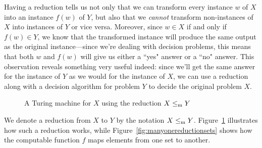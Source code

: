 Having a reduction tells us not only that we can transform every instance $w$ of $X$ into an instance $f(w)$ of $Y$, but also that we \emph{cannot} transform non-instances of $X$ into instances of $Y$ or vice versa. Moreover, since $w \in X$ if and only if $f(w) \in Y$, we know that the transformed instance will produce the same output as the original instance---since we're dealing with decision problems, this means that both $w$ and $f(w)$ will give us either a ``yes" answer or a ``no" answer. This observation reveals something very useful indeed: since we'll get the same answer for the instance of $Y$ as we would for the instance of $X$, we can use a reduction along with a decision algorithm for problem $Y$ to decide the original problem $X$.

\begin{figure}
\centering
{}
\caption{A Turing machine for $X$ using the reduction $X \leq_{\mathrm{m}} Y$}
\label{fig:manyonereduction}
\end{figure}

We denote a reduction from $X$ to $Y$ by the notation $X \leq_{\mathrm{m}} Y$. Figure~\ref{fig:manyonereduction} illustrates how such a reduction works, while Figure~\ref{fig:manyonereductionsets} shows how the computable function $f$ maps elements from one set to another.

